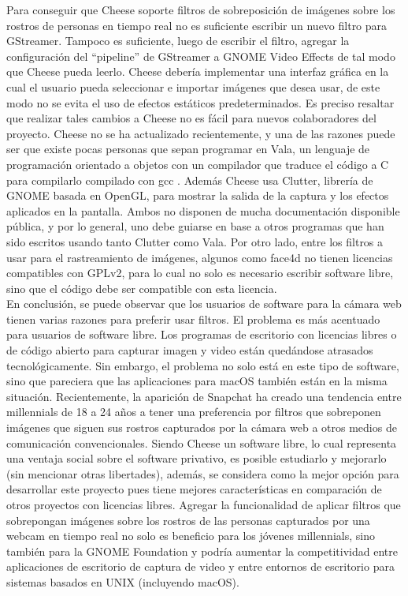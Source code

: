 \documentclass[a4paper,openright,12pt]{report}
\begin{document}
Para conseguir que Cheese soporte filtros de sobreposición de imágenes sobre los
rostros de personas en tiempo real no es suficiente escribir un nuevo filtro
para GStreamer. Tampoco es suficiente, luego de escribir el filtro, agregar la
configuración del “pipeline” de GStreamer a GNOME Video Effects de tal modo que
Cheese pueda leerlo. Cheese debería implementar una interfaz gráfica en la cual
el usuario pueda seleccionar e importar imágenes que desea usar, de este modo no
se evita el uso de efectos estáticos predeterminados. Es preciso resaltar que
realizar tales cambios a Cheese no es fácil para nuevos colaboradores del
proyecto. Cheese no se ha actualizado recientemente, y una de las razones puede
ser que existe pocas personas que sepan programar en Vala, un lenguaje de
programación orientado a objetos con un compilador que traduce el
código a C para compilarlo compilado con gcc \cite{valaOverview}. Además Cheese usa Clutter,
librería de GNOME basada en OpenGL, para mostrar la salida de la captura y los
efectos aplicados en la pantalla. Ambos no disponen de mucha documentación
disponible pública, y por lo general, uno debe guiarse en base a otros programas
que han sido escritos usando tanto Clutter como Vala. Por otro lado, entre los
filtros a usar para el rastreamiento de imágenes, algunos como face4d no tienen
licencias compatibles con GPLv2, para lo cual no solo es necesario escribir
software libre, sino que el código debe ser compatible con esta licencia.\\

En conclusión, se puede observar que los usuarios de software para la cámara web
tienen varias razones para preferir usar filtros. El problema es más acentuado para
usuarios de software libre. Los programas de escritorio con licencias libres o
de código abierto para capturar imagen y video están quedándose atrasados
tecnológicamente. Sin embargo, el problema no solo está en este tipo de software,
sino que pareciera que las aplicaciones para macOS también están en la misma
situación. Recientemente, la aparición de Snapchat ha creado una tendencia entre
millennials de 18 a 24 años a tener una preferencia por filtros que sobreponen
imágenes que siguen sus rostros capturados por la cámara web a otros medios
de comunicación convencionales. Siendo Cheese un software libre, lo cual
representa una ventaja social sobre el software privativo, es posible estudiarlo
y mejorarlo (sin mencionar otras libertades), además, se considera como la mejor
opción para desarrollar este proyecto pues tiene mejores características en
comparación de otros proyectos con licencias libres. Agregar la funcionalidad de
aplicar filtros que sobrepongan imágenes sobre los rostros de las personas
capturados por una webcam en tiempo real no solo es beneficio para los jóvenes
millennials, sino también para la GNOME Foundation y podría aumentar la
competitividad entre aplicaciones de escritorio de captura de video y entre
entornos de escritorio para sistemas basados en UNIX (incluyendo macOS).
\end{document}
